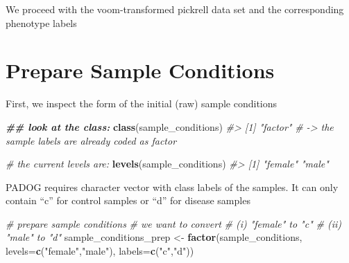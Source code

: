 \documentclass[
]{book}
\newenvironment{Shaded}{\begin{snugshade}}{\end{snugshade}}
\newcommand{\AttributeTok}[1]{\textcolor[rgb]{0.13,0.29,0.53}{#1}}
\newcommand{\CommentTok}[1]{\textcolor[rgb]{0.56,0.35,0.01}{\textit{#1}}}
\newcommand{\DocumentationTok}[1]{\textcolor[rgb]{0.56,0.35,0.01}{\textbf{\textit{#1}}}}
\newcommand{\FunctionTok}[1]{\textcolor[rgb]{0.13,0.29,0.53}{\textbf{#1}}}
\newcommand{\NormalTok}[1]{#1}
\newcommand{\OtherTok}[1]{\textcolor[rgb]{0.56,0.35,0.01}{#1}}
\newcommand{\SpecialCharTok}[1]{\textcolor[rgb]{0.81,0.36,0.00}{\textbf{#1}}}
\newcommand{\StringTok}[1]{\textcolor[rgb]{0.31,0.60,0.02}{#1}}
\begin{document}
We proceed with the voom-transformed pickrell data set and the corresponding phenotype labels

\begin{Shaded}
\end{Shaded}

\hypertarget{prepare-sample-conditions}{%
\section{Prepare Sample Conditions}\label{prepare-sample-conditions}}

First, we inspect the form of the initial (raw) sample conditions

\begin{Shaded}
\begin{Highlighting}[]
\DocumentationTok{\#\# look at the class: }
\FunctionTok{class}\NormalTok{(sample\_conditions)}
\CommentTok{\#\textgreater{} [1] "factor"}
\CommentTok{\# {-}\textgreater{} the sample labels are already coded as factor}

\CommentTok{\# the current levels are:}
\FunctionTok{levels}\NormalTok{(sample\_conditions)}
\CommentTok{\#\textgreater{} [1] "female" "male"}
\end{Highlighting}
\end{Shaded}

PADOG requires character vector with class labels of the samples. It can only contain ``c'' for control samples or ``d'' for disease samples

\begin{Shaded}
\begin{Highlighting}[]

\CommentTok{\# prepare sample conditions}
\CommentTok{\# we want to convert }
\CommentTok{\# (i) "female" to "c"}
\CommentTok{\# (ii) "male" to "d"}
\NormalTok{sample\_conditions\_prep }\OtherTok{\textless{}{-}} \FunctionTok{factor}\NormalTok{(sample\_conditions, }
                                \AttributeTok{levels=}\FunctionTok{c}\NormalTok{(}\StringTok{"female"}\NormalTok{,}\StringTok{"male"}\NormalTok{), }
                                \AttributeTok{labels=}\FunctionTok{c}\NormalTok{(}\StringTok{"c"}\NormalTok{,}\StringTok{"d"}\NormalTok{))}
\end{Highlighting}
\end{Shaded}
\end{document}
